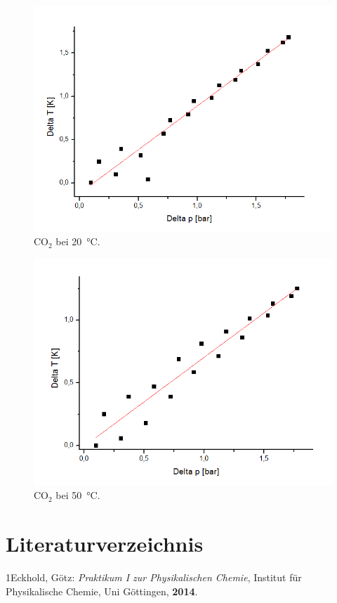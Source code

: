 \documentclass[a4paper,12pt,oneside,onecolum,final,openany]{report}
\begin{document}
\begin{center}
\begin{figure}[h]
\includegraphics[width=13.5cm]{CO2bei22,8.png}
\caption{$\text{CO}_2$ bei 20~°C.}
\end{figure}
\end{center}
\begin{center}
\begin{figure}[h]
\includegraphics[width=13.5cm]{CO2bei50,8.png}
\caption{$\text{CO}_2$ bei 50~°C.}
\end{figure}
\end{center}
\newpage


\chapter{Literaturverzeichnis}
1\quad Eckhold, Götz: \emph{Praktikum I zur Physikalischen Chemie}, Institut für Physikalische Chemie, Uni Göttingen, \textbf{2014}.
\end{document}
